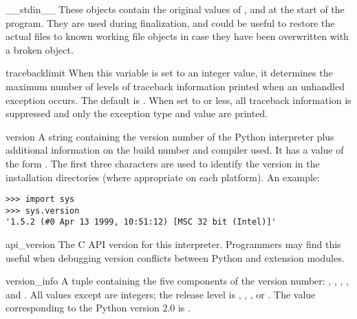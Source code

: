 \begin{datadesc}{__stdin__}
  These objects contain the original values of ,
   and  at the start of the program.  They
  are used during finalization, and could be useful to restore the
  actual files to known working file objects in case they have been
  overwritten with a broken object.
\end{datadesc}

\begin{datadesc}{tracebacklimit}
  When this variable is set to an integer value, it determines the
  maximum number of levels of traceback information printed when an
  unhandled exception occurs.  The default is .  When set
  to  or less, all traceback information is suppressed and
  only the exception type and value are printed.
\end{datadesc}

\begin{datadesc}{version}
  A string containing the version number of the Python interpreter
  plus additional information on the build number and compiler used.
  It has a value of the form .  The first three characters are used to identify
  the version in the installation directories (where appropriate on
  each platform).  An example:

\begin{verbatim}
>>> import sys
>>> sys.version
'1.5.2 (#0 Apr 13 1999, 10:51:12) [MSC 32 bit (Intel)]'
\end{verbatim}
\end{datadesc}

\begin{datadesc}{api_version}
  The C API version for this interpreter.  Programmers may find this useful
  when debugging version conflicts between Python and extension
  modules. 
\end{datadesc}

\begin{datadesc}{version_info}
  A tuple containing the five components of the version number:
  , , , , and
  .  All values except  are integers;
  the release level is , ,
  , or .  The 
  value corresponding to the Python version 2.0 is .
\end{datadesc}

